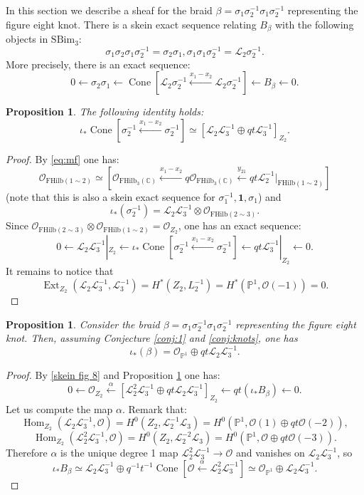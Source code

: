 \documentclass[12pt]{amsart}
\numberwithin{equation}{section}
\newtheorem{proposition}[theorem]{Proposition}
\theoremstyle{definition}
\theoremstyle{remark}
\DeclareMathOperator{\Hom}{Hom}
\DeclareMathOperator{\Ext}{Ext}
\DeclareMathOperator{\Cone}{Cone}
\newcommand{\CC}{\mathbb{C}}
\newcommand{\PP}{\mathbb{P}}
\newcommand{\CL}{\mathcal{L}}
\newcommand{\CO}{\mathcal{O}}
\renewcommand{\1}{\mathbf{1}}
\newcommand{\FH}{\mathrm{FHilb}}
\newcommand{\SBim}{\mathrm{SBim}}
\begin{document}
In this section we describe a sheaf for the braid $\beta=\sigma_1\sigma_2^{-1}\sigma_1\sigma_2^{-1}$ representing the figure eight knot.
There is a skein exact sequence relating  $B_{\beta}$ with the following objects in $\SBim_3$:
$$
\sigma_1\sigma_2\sigma_1\sigma_2^{-1}=\sigma_2\sigma_1, \sigma_1\sigma_1\sigma_2^{-1}=\CL_2\sigma_2^{-1}.
$$
More precisely, there is an exact sequence:
\begin{equation}
\label{skein fig 8}
0\xleftarrow{}\sigma_2\sigma_1\xleftarrow{}\Cone\left[\CL_2\sigma_2^{-1}\xleftarrow{x_1-x_2} \CL_2\sigma_2^{-1}\right]\xleftarrow{}B_{\beta}\xleftarrow{} 0.
\end{equation}
\begin{proposition}
\label{prop:cone}
The following identity holds:
$$
\iota_*\Cone\left[\sigma_2^{-1}\xleftarrow{x_1-x_2} \sigma_2^{-1}\right]\simeq \left[\CL_2\CL_3^{-1}\oplus qt\CL_3^{-1}\right]_{Z_2}.
$$
\end{proposition}
\begin{proof}
By \eqref{eq:mf}  one has:
$$
\CO_{\FH(1\sim 2)}\simeq [\CO_{\FH_3(\CC)}\xleftarrow{x_1-x_2}q\CO_{\FH_3(\CC)}\xleftarrow{y_{21}}qt\CL_2^{-1}|_{\FH(1\sim 2)}]
$$
(note that this is also a skein exact sequence for $\sigma_1^{-1},\1, \sigma_1$) and 
$$
\iota_*(\sigma_2^{-1})=\CL_2\CL_3^{-1}\otimes \CO_{\FH(2\sim 3)}.
$$
Since $\CO_{\FH(2\sim 3)}\otimes \CO_{\FH(1\sim 2)}=\CO_{Z_2}$, one has an exact sequence:
$$
0\leftarrow{} \CL_2\CL_3^{-1}|_{Z_2}\xleftarrow{} \iota_*\Cone\left[\sigma_2^{-1}\xleftarrow{x_1-x_2} \sigma_2^{-1}\right] \xleftarrow{}qt\CL_3^{-1}|_{Z_2}
\xleftarrow{} 0.
$$
It remains to notice that 
$$
\Ext_{Z_2}(\CL_2\CL_3^{-1},\CL_3^{-1})=H^{*}(Z_2,L_2^{-1})=H^{*}(\PP^1,\CO(-1))=0.
$$
\end{proof}


\begin{proposition}
Consider the braid $\beta=\sigma_1\sigma_2^{-1}\sigma_1\sigma_2^{-1}$ representing the figure eight knot.
Then, assuming Conjecture \ref{conj:1} and \ref{conj:knots}, one has
$$
\iota_*(\beta)=\CO_{\PP^1}\oplus qt\CL_2\CL_3^{-1}.
$$
\end{proposition}

\begin{proof}
By \eqref{skein fig 8} and Proposition \ref{prop:cone} one has:
$$
0\xleftarrow{}\CO_{Z_2}\xleftarrow{\alpha}\left[\CL_2^2\CL_3^{-1}\oplus qt\CL_2\CL_3^{-1}\right]_{Z_2}\xleftarrow{}qt(\iota_*B_{\beta})\xleftarrow{} 0.
$$
Let us compute the map $\alpha$. Remark that:
$$
\Hom_{Z_2}(\CL_2\CL_3^{-1},\CO)=H^0(Z_2,\CL_2^{-1}\CL_3)=H^0(\PP^1,\CO(1)\oplus qt\CO(-2)),
$$
$$
\Hom_{Z_2}(\CL_2^2\CL_3^{-1},\CO)=H^0(Z_2,\CL_2^{-2}\CL_3)=H^0(\PP^1,\CO\oplus qt\CO(-3)).
$$
Therefore $\alpha$ is the unique degree 1 map $\CL_2^2\CL_3^{-1}\to \CO$ and vanishes on $\CL_2\CL_3^{-1}$, so
$$
\iota_*B_{\beta}\simeq \CL_2\CL_3^{-1}\oplus q^{-1}t^{-1}\Cone[\CO\xleftarrow{\alpha} \CL_2^2\CL_3^{-1}]\simeq \CO_{\PP^1}\oplus \CL_2\CL_3^{-1}.
$$
\end{proof}
\end{document}

